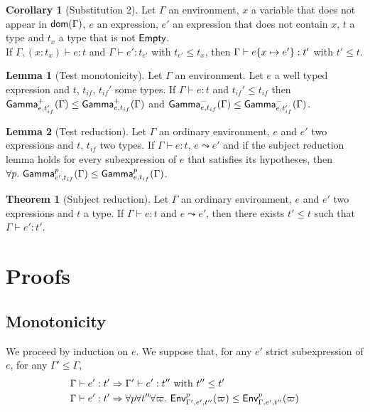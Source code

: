 \documentclass[a4paper]{article}
\theoremstyle{definition}
\newtheorem{theorem}{Theorem}
\newtheorem{lemma}{Lemma}
\newtheorem{corollary}{Corollary}
\begin{document}
        \begin{corollary}[Substitution 2]
          Let $\Gamma$ an environment, $x$ a variable that does not appear in $\textsf{dom}(\Gamma)$, $e$ an expression, $e'$ an expression that does not contain $x$, $t$ a type and $t_x$ a type that is not $\textsf{Empty}$.\\
          If $\Gamma, (x:t_x) \vdash e:t$ and $\Gamma \vdash e':t_{e'}$ with $t_{e'} \leq t_x$, then $\Gamma \vdash e \{x \mapsto e'\}:t'$ with $t'\leq t$.
        \end{corollary}
    
        \begin{lemma}[Test monotonicity]
          Let $\Gamma$ an environment. Let $e$ a well typed expression and $t$, $t_{if}$, $t_{if}'$ some types.
          If $\Gamma \vdash e : t$ and $t_{if}' \leq t_{if}$ then $\textsf{Gamma}^{+}_{e,t_{if}'}(\Gamma) \leq \textsf{Gamma}^{+}_{e,t_{if}}(\Gamma)$
          and $\textsf{Gamma}^{-}_{e,t_{if}}(\Gamma) \leq \textsf{Gamma}^{-}_{e,t_{if}'}(\Gamma)$.
        \end{lemma}
    
        \begin{lemma}[Test reduction]
          Let $\Gamma$ an ordinary environment, $e$ and $e'$ two expressions and $t$, $t_{if}$ two types.
          If $\Gamma \vdash e : t$, $e \leadsto e'$ and
          if the subject reduction lemma holds for every subexpression of $e$ that satisfies its hypotheses,
          then $\forall p.\ \textsf{Gamma}^{p}_{e',t_{if}}(\Gamma) \leq \textsf{Gamma}^{p}_{e,t_{if}}(\Gamma)$.
        \end{lemma}
    
        \begin{theorem}[Subject reduction]
          Let $\Gamma$ an ordinary environment, $e$ and $e'$ two expressions and $t$ a type.
          If $\Gamma \vdash e : t$ and $e \leadsto e'$, then there exists $t' \leq t$ such that $\Gamma \vdash e' : t'$.
        \end{theorem}
    
        \section{Proofs}
    
        \subsection{Monotonicity}
    
        We proceed by induction on $e$. We suppose that, for any $e'$ strict subexpression of $e$, for any $\Gamma' \leq \Gamma$,
        \begin{align*}
          &\Gamma \vdash e':t' \Rightarrow \Gamma' \vdash e':t'' \text{ with } t'' \leq t'\\
          &\Gamma \vdash e':t' \Rightarrow \forall p \forall t'' \forall \varpi.\ \textsf{Env}^{p}_{\Gamma',e',t''} (\varpi) \leq \textsf{Env}^{p}_{\Gamma,e',t''} (\varpi)
        \end{align*}
    
\end{document}
